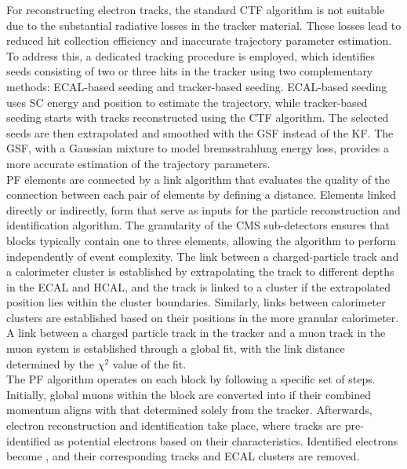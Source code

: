 For reconstructing electron tracks, the standard \ac{CTF} algorithm is not suitable due to the substantial radiative losses in the tracker material. 
These losses lead to reduced hit collection efficiency and inaccurate trajectory parameter estimation. 
To address this, a dedicated tracking procedure is employed, which identifies seeds consisting of two or three hits in the tracker using two complementary methods: \ac{ECAL}-based seeding and tracker-based seeding. 
\ac{ECAL}-based seeding uses \ac{SC} energy and position to estimate the trajectory, while tracker-based seeding starts with tracks reconstructed using the \ac{CTF} algorithm.
The selected seeds are then extrapolated and smoothed with the \ac{GSF} instead of the \ac{KF}. 
The \ac{GSF}, with a Gaussian mixture to model bremsstrahlung energy loss, provides a more accurate estimation of the trajectory parameters. \\

\ac{PF} elements are connected by a link algorithm that evaluates the quality of the connection between each pair of elements by defining a distance.
Elements linked directly or indirectly, form  that serve as inputs for the particle reconstruction and identification algorithm. 
The granularity of the \ac{CMS} sub-detectors ensures that blocks typically contain one to three elements, allowing the algorithm to perform independently of event complexity. 
The link between a charged-particle track and a calorimeter cluster is established by extrapolating the track to different depths in the \ac{ECAL} and \ac{HCAL}, and the track is linked to a cluster if the extrapolated position lies within the cluster boundaries. 
Similarly, links between calorimeter clusters are established based on their positions in the more granular calorimeter. 
A link between a charged particle track in the tracker and a muon track in the muon system is established through a global fit, with the link distance determined by the $\chi^2$ value of the fit. \\

The \ac{PF} algorithm operates on each block by following a specific set of steps. 
Initially, global muons within the block are converted into  if their combined momentum aligns with that determined solely from the tracker. 
Afterwards, electron reconstruction and identification take place, where tracks are pre-identified as potential electrons based on their characteristics. 
Identified electrons become , and their corresponding tracks and \ac{ECAL} clusters are removed. \\

